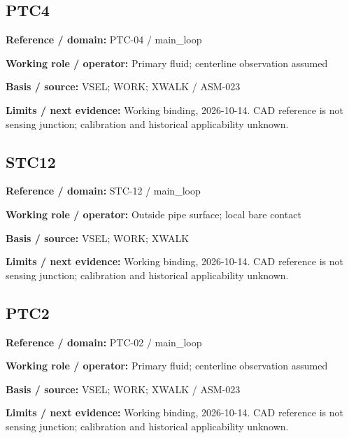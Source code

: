 \documentclass[11pt]{article}
\begin{document}
\par\noindent\begin{minipage}{\textwidth}\small\setlength{\parskip}{2pt}
\subsection*{PTC4}
\textbf{Reference / domain:} PTC-04 / main\_\allowbreak{}loop\par
\textbf{Working role / operator:} Primary fluid; centerline observation assumed\par
\textbf{Basis / source:} VSEL; WORK; XWALK / ASM-023\par
\textbf{Limits / next evidence:} Working binding, 2026-10-14. CAD reference is not sensing junction; calibration and historical applicability unknown.\par
\end{minipage}\par\vspace{5pt}
\par\noindent\begin{minipage}{\textwidth}\small\setlength{\parskip}{2pt}
\subsection*{STC12}
\textbf{Reference / domain:} STC-12 / main\_\allowbreak{}loop\par
\textbf{Working role / operator:} Outside pipe surface; local bare contact\par
\textbf{Basis / source:} VSEL; WORK; XWALK\par
\textbf{Limits / next evidence:} Working binding, 2026-10-14. CAD reference is not sensing junction; calibration and historical applicability unknown.\par
\end{minipage}\par\vspace{5pt}
\par\noindent\begin{minipage}{\textwidth}\small\setlength{\parskip}{2pt}
\subsection*{PTC2}
\textbf{Reference / domain:} PTC-02 / main\_\allowbreak{}loop\par
\textbf{Working role / operator:} Primary fluid; centerline observation assumed\par
\textbf{Basis / source:} VSEL; WORK; XWALK / ASM-023\par
\textbf{Limits / next evidence:} Working binding, 2026-10-14. CAD reference is not sensing junction; calibration and historical applicability unknown.\par
\end{minipage}\par\vspace{5pt}
\end{document}
